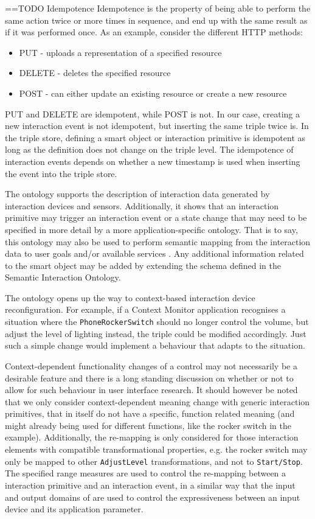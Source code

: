 ==TODO Idempotence
Idempotence is the property of being able to perform the same action twice or more times in sequence, and end up with the same result as if it was performed once. As an example, consider the different HTTP methods:

\begin{itemize}
	\item PUT - uploads a representation of a specified resource
	\item DELETE - deletes the specified resource
	\item POST - can either update an existing resource or create a new resource
\end{itemize}

PUT and DELETE are idempotent, while POST is not. In our case, creating a new interaction event is not idempotent, but inserting the same triple twice is. In the triple store, defining a smart object or interaction primitive is idempotent as long as the definition  does not change on the triple level. The idempotence of interaction events depends on whether a new timestamp is used when inserting the event into the triple store.



The ontology supports the description of interaction data generated by interaction devices and sensors. Additionally, it shows that an interaction primitive may trigger an interaction event or a state change that may need to be specified in more detail by a more application-specific ontology. That is to say, this ontology may also be used to perform semantic mapping from the interaction data to user goals and/or available services \cite{Niezen2010}. Any additional information related to the smart object may be added by extending the schema defined in the Semantic Interaction Ontology. 

The ontology opens up the way to context-based interaction device reconfiguration. For example, if a Context Monitor application recognises a situation where the \texttt{PhoneRockerSwitch} should no longer control the volume, but adjust the level of lighting instead, the triple could be modified accordingly. Just such a simple change would implement a behaviour that adapts to the situation.

Context-dependent functionality changes of a control may not necessarily be a desirable feature and there is a long standing discussion on whether or not to allow for such behaviour in user interface research. It should however be noted that we only consider context-dependent meaning change with generic interaction primitives, that in itself do not have a specific, function related meaning (and might already being used for different functions, like the rocker switch in the example). Additionally, the re-mapping is only considered for those interaction elements with compatible transformational properties, e.g. the rocker switch may only be mapped to other \texttt{AdjustLevel} transformations, and not to \texttt{Start/Stop}. The specified range measures are used to control the re-mapping between a interaction primitive and an interaction event, in a similar way that the input and output domains of \cite{MacKinlay1990} are used to control the expressiveness between an input device and its application parameter.

